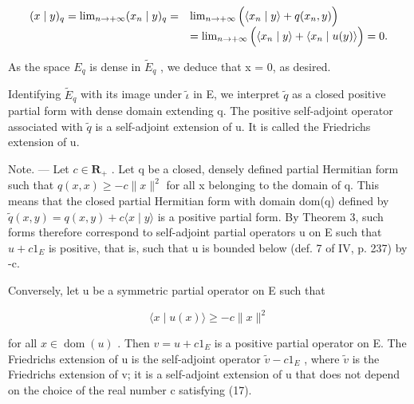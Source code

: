 \[
\begin{array}{r l} (x \mid y) _ {q} = \lim _ {n \to + \infty} (x _ {n} \mid y) _ {q} = & \lim _ {n \to + \infty} \Big (\langle x _ {n} \mid y \rangle + q (x _ {n}, y) \Big) \\ & = \lim _ {n \to + \infty} \Big (\langle x _ {n} \mid y \rangle + \langle x _ {n} \mid u (y) \rangle \Big) = 0. \end{array}
\]

As the space \(E_{q}\) is dense in \(\widetilde{E}_{q}\) , we deduce that x = 0, as desired.

Identifying \(\widetilde{E}_{q}\) with its image under \(\widetilde{\iota}\) in E, we interpret \(\widetilde{q}\) as a closed positive partial form with dense domain extending q. The positive self-adjoint operator associated with \(\widetilde{q}\) is a self-adjoint extension of u. It is called the Friedrichs extension of u.

Note. --- Let \(c \in \mathbf R_{+}\) . Let q be a closed, densely defined partial Hermitian form such that \(q(x, x) \geqslant -c \|x\|^2\) for all x belonging to the domain of q. This means that the closed partial Hermitian form with domain dom(q) defined by \(\widetilde{q}(x, y) = q(x, y) + c \langle x \mid y \rangle\) is a positive partial form. By Theorem 3, such forms therefore correspond to self-adjoint partial operators u on E such that \(u + c1_{E}\) is positive, that is, such that u is bounded below (def. 7 of IV, p. 237) by -c.

Conversely, let u be a symmetric partial operator on E such that

\[
\langle x \mid u (x) \rangle \geqslant - c \| x \| ^ {2}\tag{17}
\]

for all \(x \in \operatorname{dom}(u)\) . Then \(v = u + c1_{E}\) is a positive partial operator on E. The Friedrichs extension of u is the self-adjoint operator \(\widetilde{v} - c1_{E}\) , where \(\widetilde{v}\) is the Friedrichs extension of v; it is a self-adjoint extension of u that does not depend on the choice of the real number c satisfying (17).